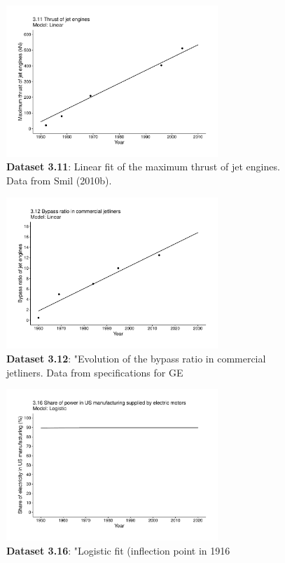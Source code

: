 \documentclass[aps,rmp,preprint,superscriptaddress,10pt,onecolumn]{article}
\begin{document}
\begin{figure}[h]
\includegraphics[width=8cm]{output/figs-ggplot/3.11.pdf}
\caption{\textbf{Dataset 3.11}: Linear fit of the maximum thrust of jet engines. Data from Smil (2010b).}
\end{figure}
	
\begin{figure}[h]
\includegraphics[width=8cm]{output/figs-ggplot/3.12.pdf}
\caption{\textbf{Dataset 3.12}: "Evolution of the bypass ratio in commercial jetliners. Data from specifications for GE}
\end{figure}
	
\begin{figure}[h]
\includegraphics[width=8cm]{output/figs-ggplot/3.16.pdf}
\caption{\textbf{Dataset 3.16}: "Logistic fit (inflection point in 1916}
\end{figure}
	
\end{document}
